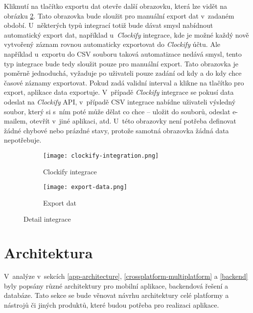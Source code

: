 Kliknutí na tlačítko exportu dat otevře další obrazovku, která lze vidět na obrázku \ref{fig:export-data}. Tato obrazovka bude sloužit pro manuální export dat v~zadaném období. U~některých typů integrací totiž bude dávat smysl nabídnout automatický export dat, například u~\emph{Clockify} integrace, kde je možné každý nově vytvořený záznam rovnou automaticky exportovat do \emph{Clockify} účtu. Ale například u~exportu do CSV souboru taková automatizace nedává smysl, tento typ integrace bude tedy sloužit pouze pro manuální export. Tato obrazovka je poměrně jednoduchá, vyžaduje po uživateli pouze zadání od kdy a do kdy chce časové záznamy exportovat. Pokud zadá validní interval a klikne na tlačítko pro export, aplikace data exportuje. V~případě \emph{Clockify} integrace se pokusí data odeslat na \emph{Clockify} API, v~případě CSV integrace nabídne uživateli výsledný soubor, který si s~ním poté může dělat co chce – uložit do souborů, odeslat e-mailem, otevřít v~jiné aplikaci, atd. U~této obrazovky není potřeba definovat žádné chybové nebo prázdné stavy, protože samotná obrazovka žádná data nepotřebuje.

\begin{figure}[h]
    \centering
    \begin{subfigure}[b]{0.4\textwidth}
		\centering
		\texttt{[image: clockify-integration.png]}
		\caption{Clockify integrace}
		\label{fig:clockify-integration}
	\end{subfigure}
	\hspace{2cm}
	\begin{subfigure}[b]{0.4\textwidth}
		\centering
		\texttt{[image: export-data.png]}
		\caption{Export dat}
		\label{fig:export-data}
	\end{subfigure}
	\caption{Detail integrace}
	\label{fig:integration-detail}
\end{figure}

\section{Architektura}

V~analýze v~sekcích \ref{app-architecture}, \ref{crossplatform-multiplatform} a \ref{backend} byly popsány různé architektury pro mobilní aplikace, backendová řešení a databáze. Tato sekce se bude věnovat návrhu architektury celé platformy a nástrojů či jiných produktů, které budou potřeba pro realizaci aplikace.

